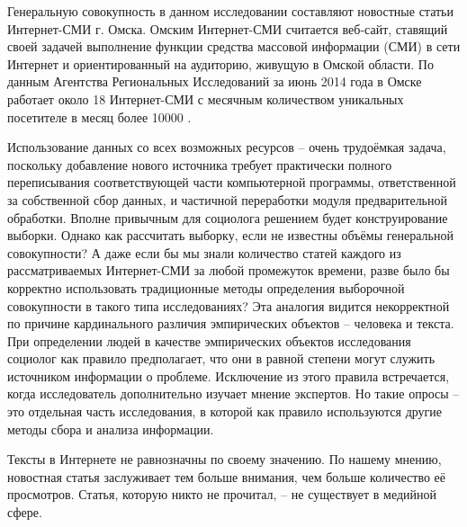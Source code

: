 Генеральную совокупность в данном исследовании составляют новостные статьи Интернет-СМИ г. Омска. Омским Интернет-СМИ считается веб-сайт, ставящий своей задачей выполнение функции средства массовой информации (СМИ) в сети Интернет и ориентированный на аудиторию, живущую в Омской области. По данным Агентства Региональных Исследований за июнь 2014 года в Омске работает около 18 Интернет-СМИ с месячным количеством уникальных посетителе в месяц более 10000 \cite{ari_rating}. 

Использование данных со всех возможных ресурсов -- очень трудоёмкая задача, поскольку добавление нового источника требует практически полного переписывания соответствующей части компьютерной программы, ответственной за собственной сбор данных, и частичной переработки модуля предварительной обработки. Вполне привычным для социолога решением будет конструирование выборки. Однако как рассчитать выборку, если не известны объёмы генеральной совокупности? А даже если бы мы знали количество статей каждого из рассматриваемых Интернет-СМИ за любой промежуток времени, разве было бы корректно использовать традиционные методы определения выборочной совокупности в такого типа исследованиях? Эта аналогия видится некорректной по причине кардинального различия эмпирических объектов -- человека и текста. При определении людей в качестве эмпирических объектов исследования социолог как правило предполагает, что они в равной степени могут служить источником информации о проблеме. Исключение из этого правила встречается, когда исследователь дополнительно изучает мнение экспертов. Но такие опросы -- это отдельная часть исследования, в которой как правило используются другие методы сбора и анализа информации.

Тексты в Интернете не равнозначны по своему значению. По нашему мнению, новостная статья заслуживает тем больше внимания, чем больше количество её просмотров. Статья, которую никто не прочитал, -- не существует в медийной сфере. %

